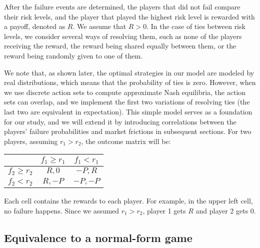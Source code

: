 \documentclass[preprint,12pt,authoryear]{elsarticle}
\theoremstyle{definition}
\begin{document}
After the failure events are determined, the players that did not fail compare their risk levels, and the player that played the highest risk level is rewarded with a payoff, denoted as $R$. We assume that $R > 0$. In the case of ties between risk levels, we consider several ways of resolving them, such as none of the players receiving the reward, the reward being shared equally between them, or the reward being randomly given to one of them.

We note that, as shown later, the optimal strategies in our model are modeled by real distributions, which means that the probability of ties is zero. However, when we use discrete action sets to compute approximate Nash equilibria, the action sets can overlap, and we implement the first two variations of resolving ties (the last two are equivalent in expectation). This simple model serves as a foundation for our study, and we will extend it by introducing correlations between the players' failure probabilities and market frictions in subsequent sections.
For two players, assuming $r_1 > r_2$, the outcome matrix will be:

\begin{center}
\begin{tabular}{|c|c|c|}
\cline{2-3}
\multicolumn{1}{c|}{} & $f_1\ge r_1$ & $f_1<r_1$ \\
\hline
$f_2\ge r_2$ & $R, 0$ & $-P, R$ \\
\hline
$f_2<r_2$ & $R, -P$ &  $-P, -P$ \\
\hline
\end{tabular}
\end{center}


Each cell contains the rewards to each player. For example, in the upper left cell, no failure happens. Since we assumed $r_1 > r_2$, player 1 gets $R$ and player 2 gets $0$.

\subsection{Equivalence to a normal-form game}
\end{document}
